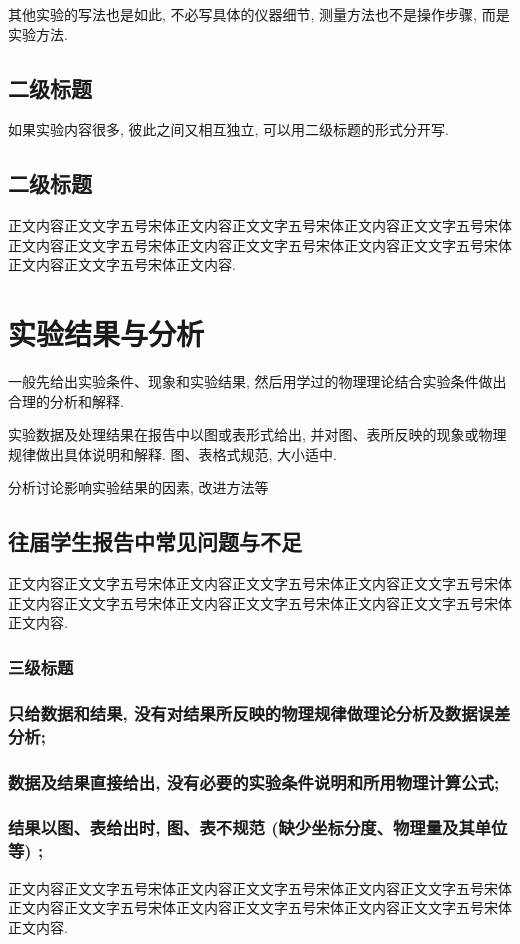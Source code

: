 \documentclass{urtemp}
\begin{document}
其他实验的写法也是如此, 不必写具体的仪器细节, 测量方法也不是操作步骤, 而是实验方法. 

\subsection{二级标题}
如果实验内容很多, 彼此之间又相互独立, 可以用二级标题的形式分开写. 

\subsection{二级标题}
正文内容正文文字五号宋体正文内容正文文字五号宋体正文内容正文文字五号宋体正文内容正文文字五号宋体正文内容正文文字五号宋体正文内容正文文字五号宋体正文内容正文文字五号宋体正文内容. 

\section{实验结果与分析}
一般先给出实验条件、现象和实验结果, 然后用学过的物理理论结合实验条件做出合理的分析和解释. 

实验数据及处理结果在报告中以图或表形式给出, 并对图、表所反映的现象或物理规律做出具体说明和解释. 图、表格式规范, 大小适中. 

分析讨论影响实验结果的因素, 改进方法等

\subsection{往届学生报告中常见问题与不足}
正文内容正文文字五号宋体正文内容正文文字五号宋体正文内容正文文字五号宋体正文内容正文文字五号宋体正文内容正文文字五号宋体正文内容正文文字五号宋体正文内容. 
\subsubsection{三级标题}
\subsubsection{只给数据和结果, 没有对结果所反映的物理规律做理论分析及数据误差分析; }
\subsubsection{数据及结果直接给出, 没有必要的实验条件说明和所用物理计算公式; }
\subsubsection{结果以图、表给出时, 图、表不规范 (缺少坐标分度、物理量及其单位等) ; }
正文内容正文文字五号宋体正文内容正文文字五号宋体正文内容正文文字五号宋体正文内容正文文字五号宋体正文内容正文文字五号宋体正文内容正文文字五号宋体正文内容. 
\end{document}
